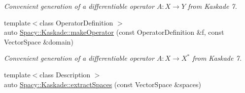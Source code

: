 \begin{DoxyCompactItemize}
\begin{DoxyCompactList}\small\item\em Convenient generation of a differentiable operator $A: X\rightarrow Y$ from Kaskade 7. \end{DoxyCompactList}\item 
{\footnotesize template$<$class Operator\+Definition $>$ }\\auto \hyperlink{group__KaskadeGroup_ga3afbd00437ea7bdb406f3d9a1f375522_ga3afbd00437ea7bdb406f3d9a1f375522}{Spacy\+::\+Kaskade\+::make\+Operator} (const Operator\+Definition \&f, const Vector\+Space \&domain)
\begin{DoxyCompactList}\small\item\em Convenient generation of a differentiable operator $A: X\rightarrow X^*$ from Kaskade 7. \end{DoxyCompactList}\item 
\hypertarget{group__KaskadeGroup_ga2354f9e41ef04d4ea06b28b719668c96}{}{\footnotesize template$<$class Description $>$ }\\auto \hyperlink{group__KaskadeGroup_ga2354f9e41ef04d4ea06b28b719668c96}{Spacy\+::\+Kaskade\+::extract\+Spaces} (const Vector\+Space \&spaces)\label{group__KaskadeGroup_ga2354f9e41ef04d4ea06b28b719668c96}


\end{DoxyCompactItemize}
